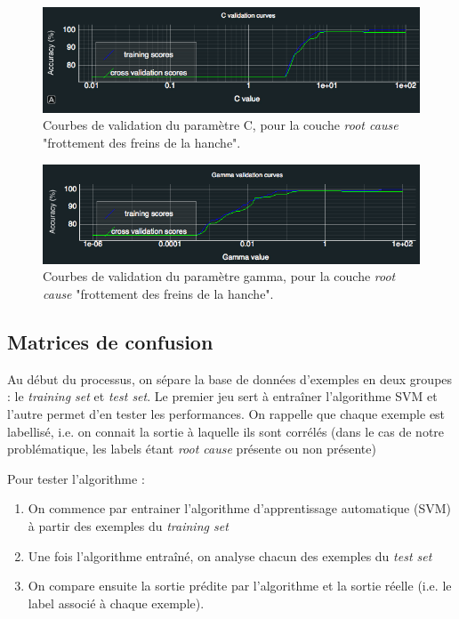  \begin{figure}[h]
 	\centering\includegraphics[width=12cm]{images/courbe_validation_c.png}
 	\caption[Courbes de validation du paramètre C]{Courbes de validation du paramètre C, pour la couche \emph{root cause} "frottement des freins de la hanche".}
 	\label{fig:Courbes de validation du paramètre C}
 \end{figure}
 
  \begin{figure}[h]
  	\centering\includegraphics[width=12cm]{images/courbe_validation_gamma.png}
  	\caption[Courbes de validation du paramètre gamma]{Courbes de validation du paramètre gamma, pour la couche \emph{root cause} "frottement des freins de la hanche".}
  	\label{fig:Courbes de validation du paramètre gamma}
  \end{figure}
  
\subsection{Matrices de confusion}
\label{Industrialisation du produit: Performances de la solution:Matrices de confusion}
Au début du processus, on sépare la base de données d'exemples en deux groupes : le \emph{training set} et \emph{test set}. Le premier jeu sert à entraîner l'algorithme SVM et l'autre permet d'en tester les performances. On rappelle que chaque exemple est labellisé, i.e. on connait  la sortie à laquelle ils sont corrélés (dans le cas de notre problématique, les labels étant \emph{root cause} présente ou non présente) 
\newline

Pour tester l'algorithme : 
\begin{enumerate}
	\item On commence par entrainer l'algorithme d'apprentissage automatique (SVM) à partir des exemples du \emph{training set}
	\item Une fois l'algorithme entraîné, on analyse chacun des exemples du \emph{test set}
	\item On compare ensuite la sortie prédite par l'algorithme et la sortie réelle (i.e. le label associé à chaque exemple). 
\end{enumerate}

